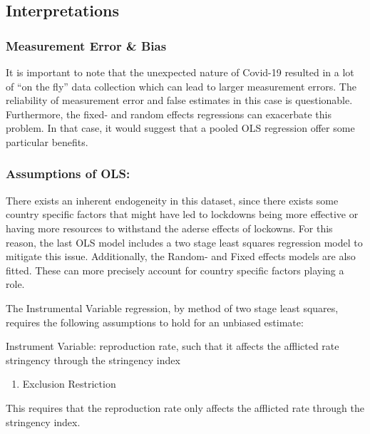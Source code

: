 \documentclass[11pt,preprint, authoryear]{elsarticle}
\numberwithin{equation}{section}
\numberwithin{figure}{section}
\numberwithin{table}{section}
\def\tightlist{} %
\begin{document}
\hypertarget{interpretations}{%
\subsection{Interpretations}\label{interpretations}}

\hypertarget{measurement-error-bias}{%
\subsubsection{Measurement Error \& Bias}\label{measurement-error-bias}}

It is important to note that the unexpected nature of Covid-19 resulted
in a lot of ``on the fly'' data collection which can lead to larger
measurement errors. The reliability of measurement error and false
estimates in this case is questionable. Furthermore, the fixed- and
random effects regressions can exacerbate this problem. In that case, it
would suggest that a pooled OLS regression offer some particular
benefits.

\hypertarget{assumptions-of-ols}{%
\subsubsection{Assumptions of OLS:}\label{assumptions-of-ols}}

There exists an inherent endogeneity in this dataset, since there exists
some country specific factors that might have led to lockdowns being
more effective or having more resources to withstand the aderse effects
of lockowns. For this reason, the last OLS model includes a two stage
least squares regression model to mitigate this issue. Additionally, the
Random- and Fixed effects models are also fitted. These can more
precisely account for country specific factors playing a role.

The Instrumental Variable regression, by method of two stage least
squares, requires the following assumptions to hold for an unbiased
estimate:

Instrument Variable: reproduction rate, such that it affects the
afflicted rate stringency through the stringency index

\begin{enumerate}
\def\labelenumi{\arabic{enumi}.}
\tightlist
\item
  Exclusion Restriction
\end{enumerate}

This requires that the reproduction rate only affects the afflicted rate
through the stringency index.
\end{document}
